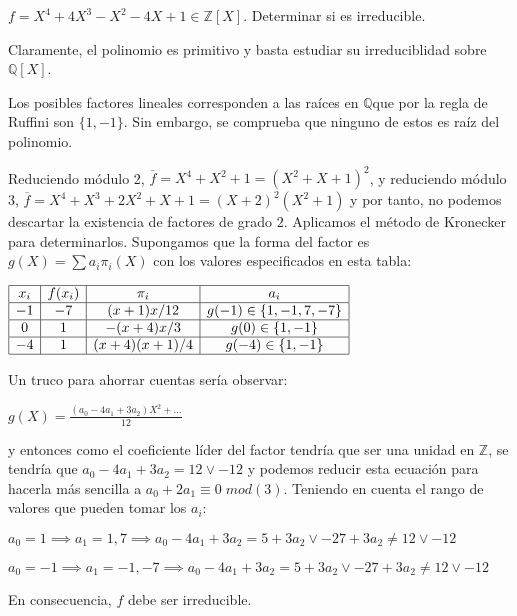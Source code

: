 \begin{example}
$f = X^4 + 4X^3 - X^2 - 4X +1 \in \mathbb{Z}[X]$. Determinar si es irreducible. 

Claramente, el polinomio es primitivo y basta estudiar su irreduciblidad sobre $\mathbb{Q}[X]$.

Los posibles factores lineales corresponden a las raíces en $\mathbb{Q}$que por la regla de Ruffini son $\{1,-1\}$. Sin embargo, se comprueba que ninguno de estos es raíz del polinomio.

Reduciendo módulo 2, $\overline{f} = X^4+X^2+1 = (X^2+X+1)^2$, y reduciendo módulo 3, $\overline{f} = X^4+X^3+2X^2+X+1 = (X+2)^2(X^2+1)$ y por tanto, no podemos descartar la existencia de factores de grado $2$. Aplicamos el método de Kronecker para determinarlos. Supongamos que la forma del factor es $g(X) = \sum a_i \pi_i(X)$ con los valores especificados en esta tabla:

$\begin{array}{|c|c|c|c|} \hline 
x_i & f(x_i) & \pi_i     & a_i  \\ \hline 
-1  & -7 & (x+1)x/12    & g(-1) \in \{1,-1,7,-7\} \\ \hline 
0   & 1  & -(x+4)x/3    & g(0)  \in \{1,-1 \} \\ \hline 
-4  & 1  & (x+4)(x+1)/4 & g(-4) \in \{1,-1 \} \\ \hline 
\end{array}$

Un truco para ahorrar cuentas sería observar:

$g(X)= \frac{(a_0-4a_1+3a_2)X^2 + \ldots}{12}$

y entonces como el coeficiente líder del factor tendría que ser una unidad en $\mathbb{Z}$, se tendría que $a_0-4a_1+3a_2 = 12 \lor -12$ y podemos reducir esta ecuación para hacerla más sencilla a $a_0+2a_1 \equiv 0 \; mod(3)$. Teniendo en cuenta el rango de valores que pueden tomar los $a_i$:

$a_0 = 1 \implies a_1 = 1,7 \implies a_0-4a_1+3a_2 = 5 + 3a_2 \lor -27 + 3a_2 \neq 12 \lor -12$

$a_0 = -1 \implies a_1 = -1,-7 \implies a_0-4a_1+3a_2 = 5 + 3a_2 \lor -27 + 3a_2 \neq 12 \lor -12$

En consecuencia, $f$ debe ser irreducible. 
\end{example}












